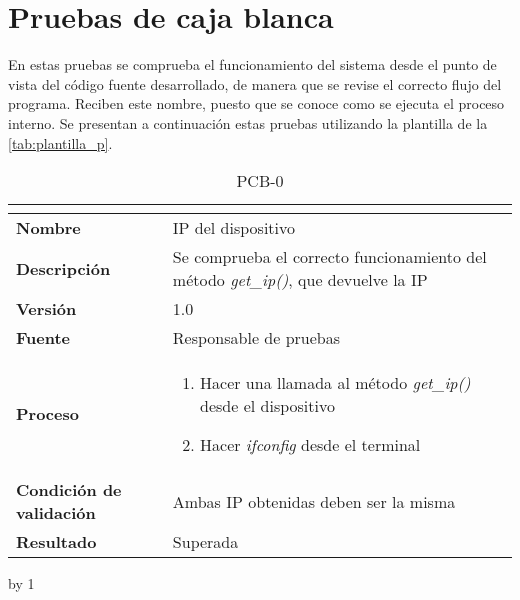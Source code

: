 \section{Pruebas de caja blanca}
En estas pruebas se comprueba el funcionamiento del sistema desde el punto de vista del código fuente desarrollado, de manera que se revise el correcto flujo del programa. Reciben este nombre, puesto que se conoce como se ejecuta el proceso interno. Se presentan a continuación estas pruebas utilizando la plantilla de la \autoref{tab:plantilla_p}. 

\newcount\pcb
{}
\begin{table}[H]
	\caption{PCB-0\number\pcb}
	\begin{tabular}{|l|p{}|}
		\hline
		\multicolumn{2}{|c|}{\cellcolor[HTML]{BFBFBF}{\color[HTML]{000000} \textbf{PCB-0\number\pcb}}} \\ \hline
		\textbf{Nombre}                  & IP del dispositivo                                                                        \\ \hline
		\textbf{Descripción}             & Se comprueba el correcto funcionamiento del método \textit{get\_ip()}, que devuelve la IP \\ \hline
		\textbf{Versión}                 & 1.0                                                                                       \\ \hline
		\textbf{Fuente}                  & Responsable de pruebas                                                                    \\ \hline
		\textbf{Proceso}                 & \begin{enumerate}
			\item Hacer una llamada al método \textit{get\_ip()} desde el dispositivo
			\item Hacer \textit{ifconfig} desde el terminal
		\end{enumerate}                                                                 \\ \hline
		\textbf{Condición de validación} & Ambas IP obtenidas deben ser la misma                                                     \\ \hline
		\textbf{Resultado}               & Superada                                                                                  \\ \hline
	\end{tabular}
\end{table}
\advance\pcb by 1
